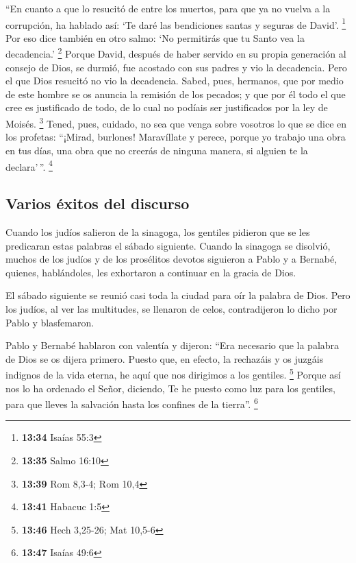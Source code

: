 \begin{paracol}{2}
 ``En cuanto a que lo resucitó de entre los muertos, para
que ya no vuelva a la corrupción, ha hablado así: `Te daré las
bendiciones santas y seguras de David'. \footnote{\textbf{13:34} Isaías
  55:3}  Por eso dice también en otro salmo: `No
permitirás que tu Santo vea la decadencia.' \footnote{\textbf{13:35}
  Salmo 16:10}  Porque David, después de haber servido en
su propia generación al consejo de Dios, se durmió, fue acostado con sus
padres y vio la decadencia.  Pero el que Dios resucitó no
vio la decadencia.  Sabed, pues, hermanos, que por medio
de este hombre se os anuncia la remisión de los pecados; 
y que por él todo el que cree es justificado de todo, de lo cual no
podíais ser justificados por la ley de Moisés. \footnote{\textbf{13:39}
  Rom 8,3-4; Rom 10,4}  Tened, pues, cuidado, no sea que
venga sobre vosotros lo que se dice en los profetas: 
``¡Mirad, burlones! Maravíllate y perece, porque yo trabajo una obra en
tus días, una obra que no creerás de ninguna manera, si alguien te la
declara'\,''. \footnote{\textbf{13:41} Habacuc 1:5}

\hypertarget{varios-uxe9xitos-del-discurso}{%
\subsection{Varios éxitos del
discurso}\label{varios-uxe9xitos-del-discurso}}

 Cuando los judíos salieron de la sinagoga, los gentiles
pidieron que se les predicaran estas palabras el sábado siguiente.
 Cuando la sinagoga se disolvió, muchos de los judíos y
de los prosélitos devotos siguieron a Pablo y a Bernabé, quienes,
hablándoles, les exhortaron a continuar en la gracia de Dios.

 El sábado siguiente se reunió casi toda la ciudad para
oír la palabra de Dios.  Pero los judíos, al ver las
multitudes, se llenaron de celos, contradijeron lo dicho por Pablo y
blasfemaron.

 Pablo y Bernabé hablaron con valentía y dijeron: ``Era
necesario que la palabra de Dios se os dijera primero. Puesto que, en
efecto, la rechazáis y os juzgáis indignos de la vida eterna, he aquí
que nos dirigimos a los gentiles. \footnote{\textbf{13:46} Hech 3,25-26;
  Mat 10,5-6}  Porque así nos lo ha ordenado el Señor,
diciendo, Te he puesto como luz para los gentiles, para que lleves la
salvación hasta los confines de la tierra''. \footnote{\textbf{13:47}
  Isaías 49:6}


\end{paracol}
